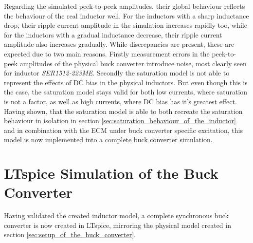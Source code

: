 Regarding the simulated peek-to-peek amplitudes, their global behaviour reflects the behaviour of the real inductor well. For the inductors with a sharp inductance drop, their ripple current amplitude in the simulation increases rapidly too, while for the inductors with a gradual inductance decrease, their ripple current amplitude also increases gradually. While discrepancies are present, these are expected due to two main reasons. Firstly measurement errors in the peek-to-peek amplitudes of the physical buck converter introduce noise, most clearly seen for inductor \textit{SER1512-223ME}. Secondly the saturation model is not able to represent the effects of \ac{DC} bias in the physical inductors. But even though this is the case, the saturation model stays valid for both low currents, where saturation is not a factor, as well as high currents, where \ac{DC} bias has it's greatest effect. \\

Having shown, that the saturation model is able to both recreate the saturation behaviour in isolation in section \ref{sec:saturation_behaviour_of_the_inductor} and in combination with the \ac{ECM} under buck converter specific excitation, this model is now implemented into a complete buck converter simulation.

\section{LTspice Simulation of the Buck Converter}\label{sec:complete_simulation_of_the_buck_converter}
Having validated the created inductor model, a complete synchronous buck converter is now created in LTspice, mirroring the physical model created in section \ref{sec:setup_of_the_buck_converter}. 
